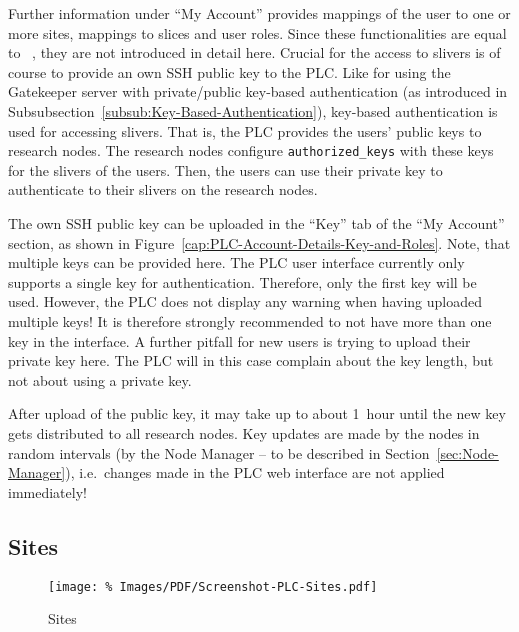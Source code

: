 Further information under ``My Account'' provides mappings of the user to one or more  sites, mappings to slices and user roles. Since these functionalities are equal to ~\cite{PR06}, they are not introduced in detail here. Crucial for the access to  slivers is of course to provide an own SSH public key to the PLC. Like for using the Gatekeeper server with private/public key-based authentication (as introduced in Subsubsection~\ref{subsub:Key-Based-Authentication}), key-based authentication is used for accessing slivers. That is, the PLC provides the users' public keys to research nodes. The research nodes configure \texttt{authorized\_keys} with these keys for the slivers of the users. Then, the users can use their private key to authenticate to their slivers on the research nodes.

The own SSH public key can be uploaded in the ``Key'' tab of the ``My Account'' section, as shown in Figure~\ref{cap:PLC-Account-Details-Key-and-Roles}. Note, that multiple keys can be provided here. The PLC user interface currently only supports a single key for authentication. Therefore, only the first key will be used. However, the PLC does not display any warning when having uploaded multiple keys! It is therefore strongly recommended to not have more than one key in the interface. A further pitfall for new users is trying to upload their private key here. The PLC will in this case complain about the key length, but not about using a private key.

After upload of the public key, it may take up to about 1~hour until the new key gets distributed to all  research nodes. Key updates are made by the nodes in random intervals (by the Node Manager -- to be described in Section~\ref{sec:Node-Manager}), i.e.\ changes made in the PLC web interface are not applied immediately!


\subsection{Sites}
\label{sub:Sites}

\begin{figure*}
\begin{center}
\texttt{[image: \%
   Images/PDF/Screenshot-PLC-Sites.pdf]}
\end{center}
\caption{Sites}
\label{cap:PLC-Sites}
\end{figure*}


